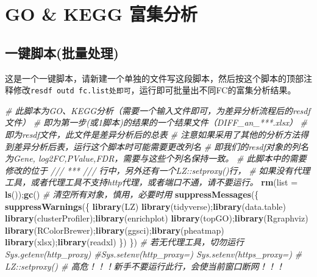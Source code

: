 \documentclass[
]{book}
\newenvironment{Shaded}{\begin{snugshade}}{\end{snugshade}}
\newcommand{\AttributeTok}[1]{\textcolor[rgb]{0.13,0.29,0.53}{#1}}
\newcommand{\CommentTok}[1]{\textcolor[rgb]{0.56,0.35,0.01}{\textit{#1}}}
\newcommand{\FunctionTok}[1]{\textcolor[rgb]{0.13,0.29,0.53}{\textbf{#1}}}
\newcommand{\NormalTok}[1]{#1}
\begin{document}
\hypertarget{enrich-auto}{%
\section{GO \& KEGG 富集分析}\label{enrich-auto}}

\hypertarget{ux4e00ux952eux811aux672cux6279ux91cfux5904ux7406}{%
\subsection{一键脚本(批量处理)}\label{ux4e00ux952eux811aux672cux6279ux91cfux5904ux7406}}

这是一个一键脚本，请新建一个单独的文件写这段脚本，然后按这个脚本的顶部注释修改\texttt{resdf\ outd\ fc.list处即可}，运行即可批量出不同FC的富集分析结果。

\begin{Shaded}
\begin{Highlighting}[]
\CommentTok{\# 此脚本为GO、KEGG分析（需要一个输入文件即可，为差异分析流程后的resdf文件）}
\CommentTok{\# 即为第一步(或1脚本)的结果的一个结果文件（DIFF\_an\_***.xlsx）}
\CommentTok{\# 即为resdf文件，此文件是差异分析后的总表}
\CommentTok{\# 注意如果采用了其他的分析方法得到差异分析后表，运行这个脚本时可能需要更改列名}
\CommentTok{\# 即我们的resdf对象的列名为Gene, log2FC,PValue,FDR，需要与这些个列名保持一致。}
\CommentTok{\# 此脚本中的需要修改的位于 /// *** /// 行中，另外还有一个LZ::setproxy()行，}
\CommentTok{\#   如果没有代理工具，或者代理工具不支持http代理，或者端口不通，请不要运行。}
\FunctionTok{rm}\NormalTok{(}\AttributeTok{list =} \FunctionTok{ls}\NormalTok{());}\FunctionTok{gc}\NormalTok{() }\CommentTok{\# 清空所有对象，慎用，必要时用}
\FunctionTok{suppressMessages}\NormalTok{(\{ }\FunctionTok{suppressWarnings}\NormalTok{(\{}
  \FunctionTok{library}\NormalTok{(LZ)}
  \FunctionTok{library}\NormalTok{(tidyverse);}\FunctionTok{library}\NormalTok{(data.table)}
  \FunctionTok{library}\NormalTok{(clusterProfiler);}\FunctionTok{library}\NormalTok{(enrichplot)}
  \FunctionTok{library}\NormalTok{(topGO);}\FunctionTok{library}\NormalTok{(Rgraphviz)}
  \FunctionTok{library}\NormalTok{(RColorBrewer);}\FunctionTok{library}\NormalTok{(ggsci);}\FunctionTok{library}\NormalTok{(pheatmap)}
  \FunctionTok{library}\NormalTok{(xlsx);}\FunctionTok{library}\NormalTok{(readxl)}
\NormalTok{\}) \})}
\CommentTok{\# 若无代理工具，切勿运行 Sys.getenv(\textquotesingle{}http\_proxy\textquotesingle{})  \#Sys.setenv(\textquotesingle{}http\_proxy\textquotesingle{}=\textquotesingle{}\textquotesingle{}) Sys.setenv(\textquotesingle{}https\_proxy\textquotesingle{}=\textquotesingle{}\textquotesingle{})}
\CommentTok{\# LZ::setproxy() \# 高危！！！新手不要运行此行，会使当前窗口断网！！！}



\end{Highlighting}
\end{Shaded}
\end{document}
